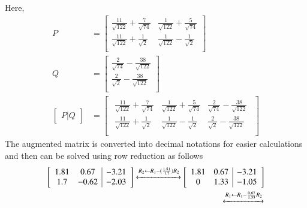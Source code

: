 \documentclass[journal,12pt,twocolumn]{IEEEtran}
\begin{document}
\begin{flushleft}
Here,
\begin{align}
P&=\begin{bmatrix}
\frac{11}{\sqrt{122}}+\frac{7}{\sqrt{74}} & \frac{1}{\sqrt{122}}+\frac{5}{\sqrt{74}}\\
\frac{11}{\sqrt{122}}+\frac{1}{\sqrt{2}} & \frac{1}{\sqrt{122}}-\frac{1}{\sqrt{2}}\\
\end{bmatrix}\\
Q&=\begin{bmatrix}
\frac{2}{\sqrt{74}}-\frac{38}{\sqrt{122}}\\
\frac{2}{\sqrt{2}}-\frac{38}{\sqrt{122}}\\
\end{bmatrix}\\
\begin{bmatrix}
P|Q 
\end{bmatrix} &= \begin{bmatrix}
\begin{array}{cc|c}
\frac{11}{\sqrt{122}}+\frac{7}{\sqrt{74}} & \frac{1}{\sqrt{122}}+\frac{5}{\sqrt{74}} & \frac{2}{\sqrt{74}}-\frac{38}{\sqrt{122}} \\
\frac{11}{\sqrt{122}}+\frac{1}{\sqrt{2}} & \frac{1}{\sqrt{122}}-\frac{1}{\sqrt{2}} & \frac{2}{\sqrt{2}}-\frac{38}{\sqrt{122}} \\
\end{array}
\end{bmatrix}
\end{align}
The augmented matrix is converted into decimal notations for easier calculations and then can be solved using row reduction as follows \\
\begin{align}
\begin{bmatrix}
\begin{array}{cc|c}
1.81 & 0.67 & -3.21 \\
 1.7 & -0.62 & -2.03\\
\end{array}
\end{bmatrix} 
 \xleftrightarrow[]{R_2\leftarrow R_1-(\frac{1.81}{1.7})R_2}
\begin{bmatrix}
\begin{array}{cc|c}
1.81 & 0.67 & -3.21 \\
0 & 1.33 & -1.05\\
\end{array}
\end{bmatrix} \\
\xleftrightarrow[]{R_1\leftarrow R_1-\frac{0.67}{1.33}R_2}

\end{align}
\end{flushleft}
\end{document}
